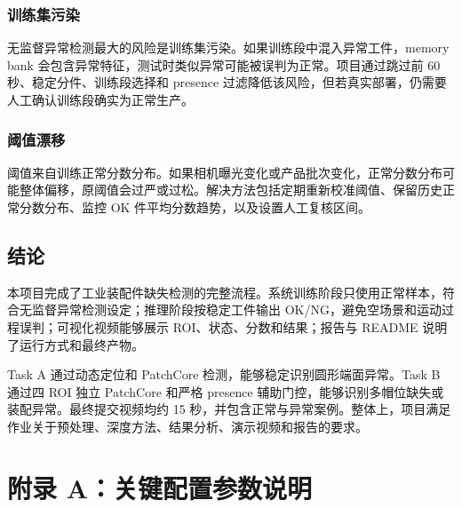 \documentclass[12pt,hyperref,a4paper,UTF8,fontset=fandol]{ctexart}
\begin{document}
\subsubsection{训练集污染}

无监督异常检测最大的风险是训练集污染。如果训练段中混入异常工件，memory bank 会包含异常特征，测试时类似异常可能被误判为正常。项目通过跳过前 60 秒、稳定分件、训练段选择和 presence 过滤降低该风险，但若真实部署，仍需要人工确认训练段确实为正常生产。

\subsubsection{阈值漂移}

阈值来自训练正常分数分布。如果相机曝光变化或产品批次变化，正常分数分布可能整体偏移，原阈值会过严或过松。解决方法包括定期重新校准阈值、保留历史正常分数分布、监控 OK 件平均分数趋势，以及设置人工复核区间。

\newpage
\subsection{结论}

本项目完成了工业装配件缺失检测的完整流程。系统训练阶段只使用正常样本，符合无监督异常检测设定；推理阶段按稳定工件输出 OK/NG，避免空场景和运动过程误判；可视化视频能够展示 ROI、状态、分数和结果；报告与 README 说明了运行方式和最终产物。

Task A 通过动态定位和 PatchCore 检测，能够稳定识别圆形端面异常。Task B 通过四 ROI 独立 PatchCore 和严格 presence 辅助门控，能够识别多帽位缺失或装配异常。最终提交视频均约 15 秒，并包含正常与异常案例。整体上，项目满足作业关于预处理、深度方法、结果分析、演示视频和报告的要求。

\newpage
\appendix
\section{附录 A：关键配置参数说明}
\end{document}
